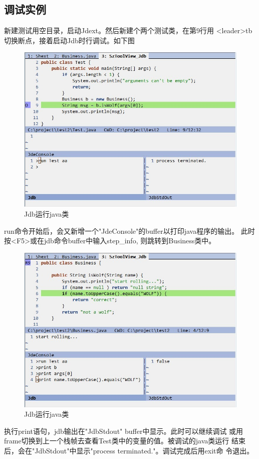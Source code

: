 \documentclass[oneside,openany]{book}
\begin{document}
  \subsection{调试实例}
  新建测试用空目录，启动Jdext。然后新建个两个测试类，在第9行用
<leader>tb切换断点，接着启动Jdb时行调试。如下图
  \FloatBarrier
  \begin{figure}[H]%
  \centering
  \includegraphics[scale=0.5]{jdb-run.jpg}
  \caption{Jdb运行java类}
  \end{figure}
  run命令开始后，会又新增一个"JdeConsole"的buffer以打印java程序的输出。
  此时按<F5>或在jdb命令buffer中输入step\_info, 则跳转到Business类中。
  \FloatBarrier
  \begin{figure}[H]%
  \centering
  \includegraphics[scale=0.5]{jdb-print2.jpg}
  \caption{Jdb运行java类}
  \end{figure}
  执行print语句，jdb输出在"JdbStdout" buffer中显示。此时可以继续调试
或用frame切换到上一个栈帧去查看Test类中的变量的值。被调试的java类运行
结束后，会在"JdbStdout"中显示"process terminated."。调试完成后用exit命
令退出。
\end{document}
